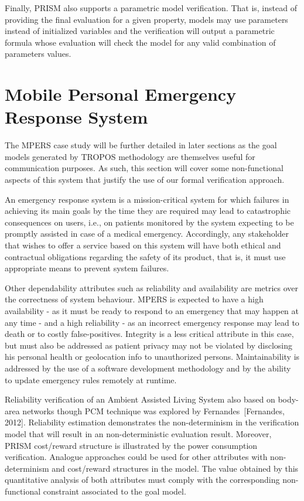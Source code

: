 Finally, PRISM also supports a parametric model verification. That is, instead of providing the final evaluation for a given property, models may use parameters instead of initialized variables and the verification will output a parametric formula whose evaluation will check the model for any valid combination of parameters values.

\section{Mobile Personal Emergency Response System}

The MPERS case study will be further detailed in later sections as the goal models generated by TROPOS methodology are themselves useful for communication purposes. As such, this section will cover some non-functional aspects of this system that justify the use of our formal verification approach.

An emergency response system is a mission-critical system for which failures in achieving its main goals by the time they are required may lead to catastrophic consequences on users, i.e., on patients monitored by the system expecting to be promptly assisted in case of a medical emergency. Accordingly, any stakeholder that wishes to offer a service based on this system will have both ethical and contractual obligations regarding the safety of its product, that is, it must use appropriate means to prevent system failures.

Other dependability attributes such as reliability and availability are metrics over the correctness of system behaviour. MPERS is expected to have a high availability - as it must be ready to respond to an emergency that may happen at any time - and a high reliability - as an incorrect emergency response may lead to death or to costly false-positives. Integrity is a less critical attribute in this case, but must also be addressed as patient privacy may not be violated by disclosing his personal health or geolocation info to unauthorized persons. Maintainability is addressed by the use of a software development methodology and by the ability to update emergency rules remotely at runtime.


Reliability verification of an Ambient Assisted Living System also based on body-area networks though PCM technique was explored by Fernandes~[Fernandes, 2012]. Reliability estimation demonstrates the non-determinism in the verification model that will result in an non-deterministic evaluation result. Moreover, PRISM cost/reward structure is illustrated by the power consumption verification. Analogue approaches could be used for other attributes with non-determinism and cost/reward structures in the model. The value obtained by this quantitative analysis of both attributes must comply with the corresponding non-functional constraint associated to the goal model.

